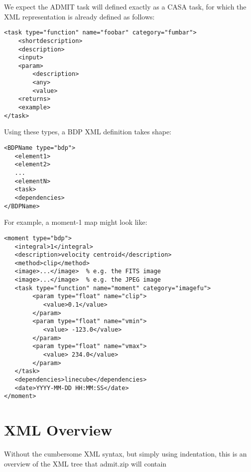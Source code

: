 \documentclass{report}
\begin{document}
We expect the ADMIT task will defined exactly as a CASA task, for which the XML
representation is already defined as follows:

\begin{verbatim}
<task type="function" name="foobar" category="fumbar">
    <shortdescription>
    <description>
    <input>
    <param>
        <description>
        <any>
        <value>
    <returns>
    <example>
</task>  

\end{verbatim}

Using these types, a BDP XML definition takes shape:

\begin{verbatim}
<BDPName type="bdp">
   <element1>
   <element2>
   ...
   <elementN>
   <task>
   <dependencies>
</BDPName>

\end{verbatim}

\noindent For example, a moment-1 map might look like:

\begin{verbatim}
<moment type="bdp">
   <integral>1</integral>
   <description>velocity centroid</description>
   <method>clip</method>
   <image>...</image>  % e.g. the FITS image
   <image>...</image>  % e.g. the JPEG image
   <task type="function" name="moment" category="imagefu">
        <param type="float" name="clip">
           <value>0.1</value>
        </param>
        <param type="float" name="vmin">
           <value> -123.0</value>
        </param>
        <param type="float" name="vmax">
           <value> 234.0</value>
        </param>
   </task>
   <dependencies>linecube</dependencies>
   <date>YYYY-MM-DD HH:MM:SS</date>
</moment>

\end{verbatim}
 

\section{XML Overview}
Without the cumbersome XML syntax, but simply using indentation, this is
an overview of the XML tree that admit.zip will contain

\newpage
\end{document}
